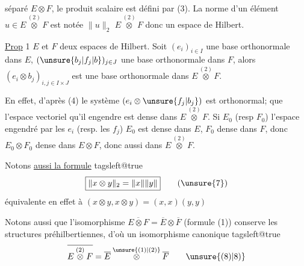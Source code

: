 
séparé $E\otimes F$,  le produit scalaire est défini par (3). La norme d'un élément  $u\in E\overset{(2)}{\otimes}F$ est notée $\lVert u\rVert_2$ $E\overset{(2)}{\otimes}F$ donc un espace de Hilbert.

\uline{Prop} 1  $E$ et $F$ deux espaces de Hilbert.  Soit $(e_i)_{i\in I}$ une base orthonormale dans $E$, $(\unsure{b_j|f_j|b})_{j\in J}$ une base orthonormale dans $F$, alors $(e_i\otimes b_j)_{i,j\in I\times J}$ est une base orthonormale dans $E\overset{(2)}{\otimes}F$.

En effet, d'après (4) le système $(e_i\otimes \unsure{f_j|b_j})$ est orthonormal;       que l'espace vectoriel qu'il engendre est dense dans $E\overset{(2)}{\otimes}F$.  Si $E_0$ (resp $F_0$)  l'espace engendré par les $e_i$ (resp. les $f_j$)    $E_0$ est dense dans $E$, $F_0$ dense dans $F$, donc $E_0\otimes F_0$ dense dans $E\otimes F$, donc aussi dans $E\overset{(2)}{\otimes}F$.

Notons \uline{aussi la formule}
\begingroup
\csname tagsleft@true\endcsname
\[
\boxed{\lVert x\otimes y\rVert_2=\lVert x\rVert\lVert y\rVert}
\tag*{(\unsure{7})}
\]
\endgroup
équivalente en effet à   $(x\otimes y,x\otimes y)=(x,x)(y,y)$ 

Notons aussi que l'isomorphisme  $\overline{E\otimes F}=\overline{E}\otimes\overline{F}$ (formule (1)) conserve  les structures préhilbertiennes, d'où un isomorphisme canonique
\begingroup
\csname tagsleft@true\endcsname
\[
\overline{E\overset{(2)}{\otimes}F}=\overline E\overset{\unsure{(1)|(2)}}{\otimes}\overline F
\tag*{\unsure{(8)|8)}}
\]
\endgroup

